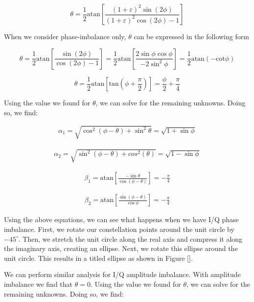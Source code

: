 \documentclass{article}
\begin{document}
\begin{equation}
	\theta = \frac{1}{2}\text{atan}\left[\frac{(1+\varepsilon)^2\sin(2\phi)}{(1+\varepsilon)^2\cos(2\phi)-1}\right]
\end{equation}

When we consider phase-imbalance only, $\theta$ can be expressed in the following form

\begin{equation}
	\theta = \frac{1}{2}\text{atan}\left[\frac{\sin(2\phi)}{\cos(2\phi)-1}\right] = \frac{1}{2}\text{atan}\left[\frac{2\sin\phi\cos\phi}{-2\sin^2\phi}\right] = \frac{1}{2}\text{atan}(-\text{cot}\phi)
\end{equation}

\begin{equation}
	\theta = \frac{1}{2}\text{atan}\left[\text{tan}\left(\phi+\frac{\pi}{2}\right)\right] = \frac{\phi}{2}+\frac{\pi}{4}
\end{equation}

Using the value we found for $\theta$, we can solve for the remaining unknowns. Doing so, we find:

\begin{align}
	\alpha_1 = \sqrt{\cos^2(\phi-\theta)+\sin^2\theta} = \sqrt{1+\sin\phi}
\end{align}

\begin{align}
	\alpha_2 = \sqrt{\sin^2(\phi-\theta)+cos^2(\theta)} = \sqrt{1-\sin\phi}
\end{align}

\begin{align}
	\beta_1 = \text{atan}\left[\frac{-\sin\theta}{\cos(\phi-\theta)}\right] = -\frac{\pi}{4}
\end{align}

\begin{align}
	\beta_2 = \text{atan}\left[\frac{\sin(\phi-\theta)}{\cos\phi}\right] = -\frac{\pi}{4}
\end{align}

Using the above equations, we can see what happens when we have I/Q phase imbalance. First, we rotate our constellation points around the unit circle by $-45^{\circ}$. Then, we stretch the unit circle along the real axis and compress it along the imaginary axis, creating an ellipse. Next, we rotate this ellipse around the unit circle. This results in a titled ellipse as shown in Figure \ref{}.

We can perform similar analysis for I/Q amplitude imbalance. With amplitude imbalance we find that $\theta = 0$. Using the value we found for $\theta$, we can solve for the remaining unknowns. Doing so, we find:
\end{document}
